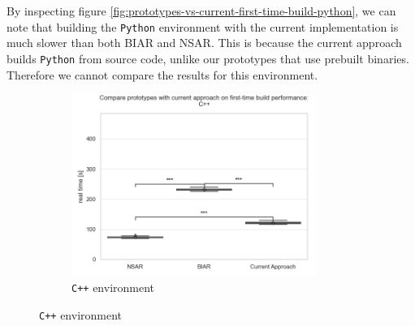 By inspecting figure \ref{fig:prototypes-vs-current-first-time-build-python}, we can note that building the \verb|Python| environment with the current implementation is much slower than both BIAR and NSAR. This is because the current approach builds \verb|Python| from source code, unlike our prototypes that use prebuilt binaries. Therefore we cannot compare the results for this environment.
\begin{figure}
    \centering
    \begin{subfigure}{\textwidth}
        \centering
      \includegraphics[width=0.87\textwidth]{thesis/graphics/compare-plots/compare_prototypes_with_current_approach_on_first-time_build_performance:_c++.png}
      \caption{\texttt{C++} environment}
      \label{fig:prototypes-vs-current-first-time-build-cpp}
    \end{subfigure}
    

\end{figure}
